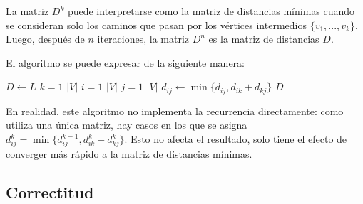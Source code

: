 \documentclass[a4paper]{report}
\begin{document}
La matriz $D^k$ puede interpretarse como la matriz de distancias mínimas cuando se consideran solo los caminos que pasan por los vértices intermedios $\{v_1, ..., v_k\}$. Luego, después de $n$ iteraciones, la matriz $D^n$ es la matriz de distancias $D$.

El algoritmo se puede expresar de la siguiente manera:

\begin{codebox}
    \li $D \gets L$
    \li \For $k = 1$ \To $|V|$ \Do
    \li \For $i = 1$ \To $|V|$ \Do
    \li \For $j = 1$ \To $|V|$ \Do
    \li $d_{ij} \gets \min{\{d_{ij}, d_{ik} + d_{kj}\}}$
    \End
    \End
    \End
    \li \Return $D$
\end{codebox}

En realidad, este algoritmo no implementa la recurrencia directamente: como utiliza una única matriz, hay casos en los que se asigna $d^k_{ij} = \min{\{d^{k - 1}_{ij}, d^k_{ik} + d^k_{kj}\}}$. Esto no afecta el resultado, solo tiene el efecto de converger más rápido a la matriz de distancias mínimas.

\subsection{Correctitud}
\end{document}
